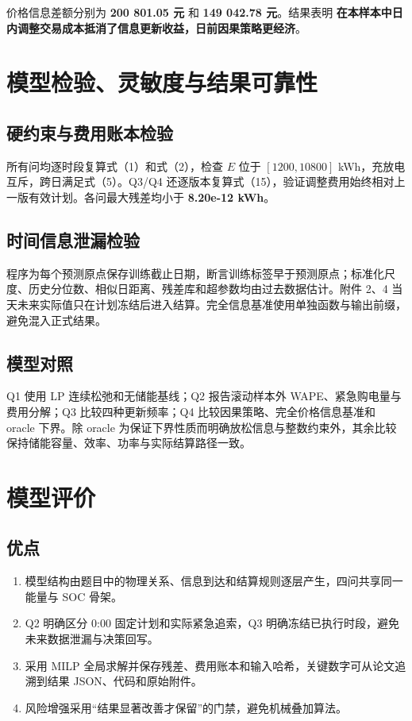 \documentclass[12pt,a4paper]{ctexart}
\begin{document}
价格信息差额分别为 \textbf{200 801.05 元} 和 \textbf{149 042.78 元}。结果表明 \textbf{在本样本中日内调整交易成本抵消了信息更新收益，日前因果策略更经济}。\par
\section{模型检验、灵敏度与结果可靠性}
\subsection{硬约束与费用账本检验}
所有问均逐时段复算式（1）和式（2），检查 $E$ 位于 $[1200,10800]$ kWh，充放电互斥，跨日满足式（5）。Q3/Q4 还逐版本复算式（15），验证调整费用始终相对上一版有效计划。各问最大残差均小于 \textbf{8.20e-12 kWh}。\par
\subsection{时间信息泄漏检验}
程序为每个预测原点保存训练截止日期，断言训练标签早于预测原点；标准化尺度、历史分位数、相似日距离、残差库和超参数均由过去数据估计。附件 2、4 当天未来实际值只在计划冻结后进入结算。完全信息基准使用单独函数与输出前缀，避免混入正式结果。\par
\subsection{模型对照}
Q1 使用 LP 连续松弛和无储能基线；Q2 报告滚动样本外 WAPE、紧急购电量与费用分解；Q3 比较四种更新频率；Q4 比较因果策略、完全价格信息基准和 oracle 下界。除 oracle 为保证下界性质而明确放松信息与整数约束外，其余比较保持储能容量、效率、功率与实际结算路径一致。\par
\section{模型评价}
\subsection{优点}
\begin{enumerate}[leftmargin=2.2em,itemsep=0.2em]
\item 模型结构由题目中的物理关系、信息到达和结算规则逐层产生，四问共享同一能量与 SOC 骨架。
\item Q2 明确区分 0:00 固定计划和实际紧急追索，Q3 明确冻结已执行时段，避免未来数据泄漏与决策回写。
\item 采用 MILP 全局求解并保存残差、费用账本和输入哈希，关键数字可从论文追溯到结果 JSON、代码和原始附件。
\item 风险增强采用“结果显著改善才保留”的门禁，避免机械叠加算法。
\end{enumerate}
\end{document}
